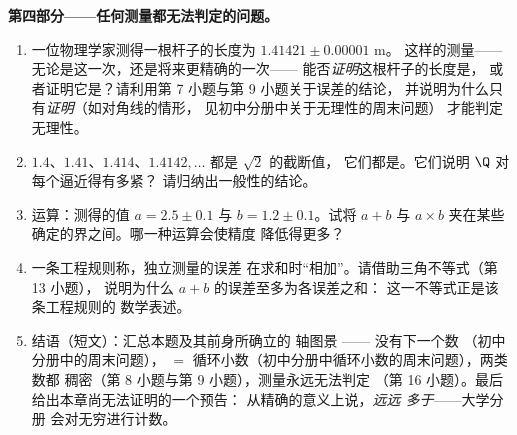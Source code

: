 \begin{problem}
\medskip
\noindent\textbf{第四部分——任何测量都无法判定的问题。}
\begin{enumerate}[resume]
  \item 一位物理学家测得一根杆子的长度为 $1.41421 \pm 0.00001$ m。
        这样的测量——无论是这一次，还是将来更精确的一次——
        能否\emph{证明}这根杆子的长度是，
        或者证明它是？请利用第 7 小题与第 9 小题关于误差的结论，
        并说明为什么只有\emph{证明}（如对角线的情形，
        见初中分册中关于无理性的周末问题）
        才能判定无理性。
  \item $1.4$、$1.41$、$1.414$、$1.4142,\dots$ 都是 $\sqrt2$ 的截断值，
        它们都是。它们说明
        $\Q$ 对每个逼近得有多紧？
        请归纳出一般性的结论。
  \item {}运算：测得的值 $a = 2.5 \pm 0.1$
        与 $b = 1.2 \pm 0.1$。试将 $a + b$ 与 $a \times b$
        夹在某些确定的界之间。哪一种运算会使精度
        降低得更多？
  \item 一条工程规则称，独立测量的误差
        在求和时“相加”。请借助三角不等式（第 13 小题），
        说明为什么 $a + b$ 的误差至多为各误差之和：
        这一不等式正是该条工程规则的
        数学表述。
  \item 结语（短文）：汇总本题及其前身所确立的
        轴图景 ——
        没有下一个数
        （初中分册中的周末问题）， $=$
        循环小数（初中分册中循环小数的周末问题），两类数都
        稠密（第 8 小题与第 9 小题），测量永远无法判定
        （第 16 小题）。最后给出本章尚无法证明的一个预告：
        从精确的意义上说，\emph{远远
        多于}——大学分册
        会对无穷进行计数。
\end{enumerate}
\end{problem}

